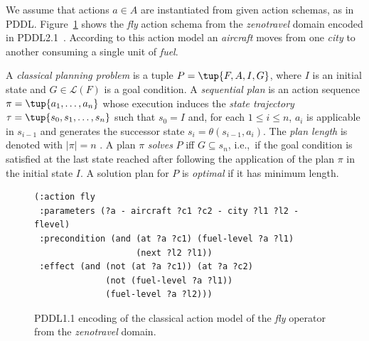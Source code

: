 \documentclass[runningheads]{llncs}
\begin{document}
We assume that actions $a\in A$ are instantiated from given action schemas, as in PDDL. Figure~\ref{fig:flyc} shows the {\em fly} action schema from the {\em zenotravel} domain encoded in PDDL2.1~\cite{fox2003pddl2}. According to this action model an {\em aircraft} moves from one {\em city} to another consuming a single unit of {\em fuel}.

A {\em classical planning problem} is a tuple $P=\tup{F,A,I,G}$, where $I$ is an initial state and $G\in\mathcal{L}(F)$ is a goal condition. A {\em sequential plan} is an action sequence $\pi=\tup{a_1, \ldots, a_n}$ whose execution induces the {\em state trajectory} $\tau=\tup{s_0, s_1, \ldots, s_n}$ such that $s_0=I$ and, for each {\small $1\leq i\leq n$}, $a_i$ is applicable in $s_{i-1}$ and generates the successor state $s_i=\theta(s_{i-1},a_i)$. The {\em plan length} is denoted with $|\pi|=n$ . A plan $\pi$ {\em solves} $P$ iff $G\subseteq s_n$, i.e.,~if the goal condition is satisfied at the last state reached after following the application of the plan $\pi$ in the initial state $I$. A solution plan for $P$ is {\em optimal} if it has minimum length.

\begin{figure}
	\begin{scriptsize}
		\begin{verbatim}
(:action fly
 :parameters (?a - aircraft ?c1 ?c2 - city ?l1 ?l2 - flevel)
 :precondition (and (at ?a ?c1) (fuel-level ?a ?l1)
                    (next ?l2 ?l1))
 :effect (and (not (at ?a ?c1)) (at ?a ?c2)
              (not (fuel-level ?a ?l1))
              (fuel-level ?a ?l2)))
		\end{verbatim}
	\end{scriptsize}
	\caption{PDDL1.1 encoding of the classical action model of the {\em fly} operator from the {\em zenotravel} domain.}
	\label{fig:flyc}
\end{figure}
\end{document}
